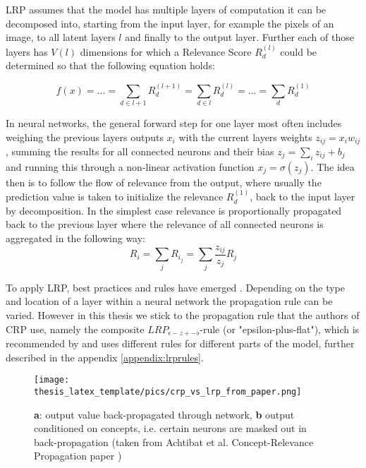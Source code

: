 LRP assumes that the model has multiple layers of computation it can be decomposed into, starting from the input layer, for example the pixels of an image, to all latent layers $l$ and finally to the output layer. Further each of those layers has $V(l)$ dimensions for which a Relevance Score $R^{(l)}_d$ could be determined so that the following equation holds:

\begin{equation}
    f(x) = ... = \sum_{d \in l+1} R^{(l+1)}_d =  \sum_{d \in l} R^{(l)}_d = ... =  \sum_{d} R^{(1)}_d
\end{equation}

In neural networks, the general forward step for one layer most often includes weighing the previous layers outputs $x_i$ with the current layers weights $z_{ij} = x_i w_{ij}$, summing the results for all connected neurons and their bias $z_{j} = \sum_{i} z_{ij} + b_j$ and running this through a non-linear activation function $x_j = \sigma (z_j)$.
The idea then is to follow the flow of relevance from the output, where usually the prediction value is taken to initialize the relevance $R^(1)_d$, back to the input layer by decomposition. In the simplest case relevance is proportionally propagated back to the previous layer where the relevance of all connected neurons is aggregated in the following way:
\begin{equation}
    R_i = \sum_{j}  R_{i_j} = \sum_{j} \frac{z_{ij}}{z_j} R_j
\end{equation}

To apply LRP, best practices and rules have emerged \cite{Kohlbrenner2020, Montavon2019, Samek2021}. Depending on the type and location of a layer within a neural network the propagation rule can be varied. However in this thesis we stick to the propagation rule that the authors of CRP use, namely the composite $LRP_{\epsilon-z+-\flat}$-rule (or "epsilon-plus-flat"), which is recommended by \cite{Kohlbrenner2020} and uses different rules for different parts of the model, further described in the appendix \autoref{appendix:lrprules}.

\begin{figure}
    \centering
    \texttt{[image: thesis\_latex\_template/pics/crp\_vs\_lrp\_from\_paper.png]}
    \caption{\textbf{a}: output value back-propagated through network, \textbf{b} output conditioned on concepts, i.e. certain neurons are masked out in back-propagation (taken from Achtibat et al. Concept-Relevance Propagation paper \cite{Achtibat2023}) }
    \label{fig:crp_vs_lrp}
\end{figure}

